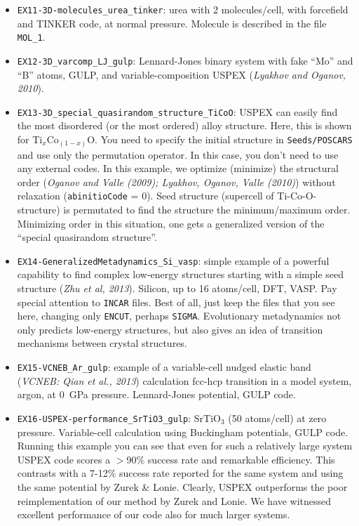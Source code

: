 \documentclass[12pt]{article}
\newcommand{\keyword}[1]{\texttt{#1}}
\newcommand{\file}[1]{\texttt{#1}}
\begin{document}
\begin{itemize}
\item \texttt{EX11-3D-molecules\_urea\_tinker}: urea with 2 molecules/cell, with
forcefield and TINKER code, at normal pressure. Molecule is described in the
file \file{MOL\_1}.

\item \texttt{EX12-3D\_varcomp\_LJ\_gulp}: Lennard-Jones binary system with fake
``Mo'' and ``B'' atoms, GULP, and variable-composition USPEX (\textit{Lyakhov
and Oganov, 2010}).

\item \texttt{EX13-3D\_special\_quasirandom\_structure\_TiCoO}: USPEX can easily
find the most disordered (or the most ordered) alloy structure. Here, this is
shown for Ti$_x$Co$_{(1-x)}$O. You need to specify the initial structure in
\file{Seeds/POSCARS} and use only the permutation operator. In this case, you
don't need to use any external codes. In this example, we optimize (minimize)
the structural order (\textit{Oganov and Valle (2009); Lyakhov, Oganov, Valle
(2010)}) without relaxation (\keyword{abinitioCode} = 0). Seed structure
(supercell of Ti-Co-O-structure) is permutated to find the structure the
minimum/maximum order. Minimizing order in this situation, one gets a
generalized version of the ``special quasirandom structure''.

\item \texttt{EX14-GeneralizedMetadynamics\_Si\_vasp}: simple example of a
powerful capability to find complex low-energy structures starting with a simple
seed structure (\textit{Zhu et al, 2013}). Silicon, up to 16 atoms/cell, DFT,
VASP. Pay special attention to \file{INCAR} files. Best of all, just keep the
files that you see here, changing only \keyword{ENCUT}, perhaps \keyword{SIGMA}.
Evolutionary metadynamics not only predicts low-energy structures, but also
gives an idea of transition mechanisms between crystal structures.

\item \texttt{EX15-VCNEB\_Ar\_gulp}: example of a variable-cell nudged elastic
band (\textit{VCNEB: Qian et al., 2013}) calculation fcc-hcp transition in a
model system, argon, at 0~GPa pressure. Lennard-Jones potential, GULP code.

\item \texttt{EX16-USPEX-performance\_SrTiO3\_gulp}: SrTiO$_3$ (50 atoms/cell)
at zero pressure. Variable-cell calculation using Buckingham potentials, GULP
code. Running this example you can see that even for such a relatively large
system USPEX code scores a $>$90\% success rate and remarkable efficiency. This
contrasts with a 7-12\% success rate reported for the same system and using the
same potential by Zurek \& Lonie. Clearly, USPEX outperforms the poor
reimplementation of our method by Zurek and Lonie. We have witnessed excellent
performance of our code also for much larger systems.


\end{itemize}
\end{document}
